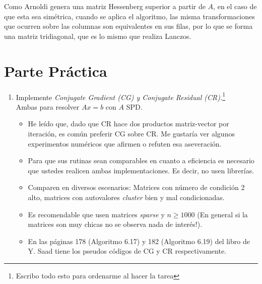 \documentclass{article}
\begin{document}
Como Arnoldi genera una matriz Hessenberg superior a partir de $A$, en el caso de que esta sea simétrica, cuando se aplica el algoritmo, las misma transformaciones que ocurren sobre las columnas son equivalentes en sus filas, por lo que se forma una matriz tridiagonal, que es lo mismo que realiza Lanczos.
\section*{Parte Práctica}
\begin{enumerate}
\item Implemente \textit{Conjugate Gradient (CG) y Conjugate Residual (CR).}\footnote{Escribo todo esto para ordenarme al hacer la tarea}\\
Ambas para resolver $Ax=b$ con $A$ SPD.
\begin{itemize}
\item He leído que, dado que CR hace dos productos matriz-vector por iteración, es común preferir CG sobre CR. Me gustaría ver algunos experimentos numéricos que afirmen o refuten esa aseveración.
\item Para que sus rutinas sean comparables en cuanto a eficiencia es necesario que ustedes realicen ambas implementaciones. Es decir, no usen librerías.
\item Comparen en diversos escenarios: Matrices con número de condición 2 alto, matrices con autovalores \textit{cluster} bien y mal condicionadas.
\item Es recomendable que usen matrices \textit{sparse} y $n\geq 1000$ (En general si la matrices son muy chicas no se observa nada de interés!).
\item En las páginas 178 (Algoritmo 6.17) y 182 (Algoritmo 6.19) del libro de Y. Saad tiene los pseudos códigos de CG y CR respectivamente.

\end{itemize}
\end{enumerate}
\end{document}
